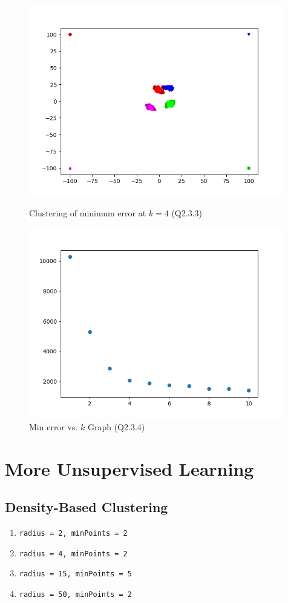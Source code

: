 \documentclass{article}
\def\enum#1{\begin{enumerate}#1\end{enumerate}}
\begin{document}
\begin{figure}
    \includegraphics[width=30em]{a2_q2_3_3.png}
    \caption{Clustering of minimum error at $k=4$ (Q2.3.3)}
    \label{fig:q2_3_3}

    \includegraphics[width=30em]{a2_q2_3_4.png}
    \caption{Min error vs. $k$ Graph (Q2.3.4)}
    \label{fig:q2_3_4}
 \end{figure}

\section{More Unsupervised Learning}

\subsection{Density-Based Clustering}
\enum{
\item \texttt{radius = 2, minPoints = 2}
\item \texttt{radius = 4, minPoints = 2}
\item \texttt{radius = 15, minPoints = 5}
\item \texttt{radius = 50, minPoints = 2}
}
\end{document}
